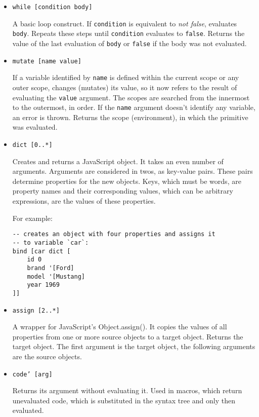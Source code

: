 \begin{itemize}
    \item \texttt{while [condition body]}
    
    A basic loop construct. If \texttt{condition} is equivalent to \textit{not
        false}, evaluates \texttt{body}. Repeats these steps until
    \texttt{condition} evaluates to \texttt{false}. Returns the value of the
    last evaluation of \texttt{body} or \texttt{false} if the body was not
    evaluated.
    
    \item \texttt{mutate [name value]}
    
    If a variable identified by \texttt{name} is defined within the current
    scope or any outer scope, changes (mutates) its value, so it now refers to
    the result of evaluating the \texttt{value} argument. The scopes are
    searched from the innermost to the outermost, in order. If the \texttt{name}
    argument doesn't identify any variable, an error is thrown. Returns the
    scope (environment), in which the primitive was evaluated.
    
    \item \texttt{dict [0..*]}
    
    Creates and returns a JavaScript object. It takes an even number of arguments. Arguments are considered in twos, as key-value pairs. These pairs determine properties for the new objects. Keys, which must be words, are property names and their corresponding values, which can be arbitrary expressions, are the values of these properties.
    
    For example:
\begin{lstlisting}
-- creates an object with four properties and assigns it
-- to variable `car`:
bind [car dict [
    id 0
    brand '[Ford]
    model '[Mustang]
    year 1969 
]]
\end{lstlisting}
    
    \item \texttt{assign [2..*]}
    
    A wrapper for JavaScript's Object.assign()\cite{mdn_assign}. It copies the values of all properties from one or more source objects to a target object. Returns the target object. The first argument is the target object, the following arguments are the source objects.
    
    \item \texttt{code' [arg]}
    
    Returns its argument without evaluating it. Used in macros, which return unevaluated code, which is substituted in the syntax tree and only then evaluated.
    

\end{itemize}
